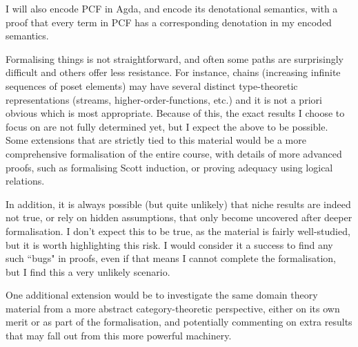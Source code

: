\documentclass{article}
\begin{document}
I will also encode PCF in Agda, and encode its denotational semantics, with a proof that every term in PCF has a corresponding denotation in my encoded semantics. 

Formalising things is not straightforward, and often some paths are surprisingly difficult and others offer less resistance. For instance, chains (increasing infinite sequences of poset elements) may have several distinct type-theoretic representations (streams, higher-order-functions, etc.) and it is not a priori obvious which is most appropriate. Because of this, the exact results I choose to focus on are not fully determined yet, but I expect the above to be possible. Some extensions that are strictly tied to this material would be a more comprehensive formalisation of the entire course, with details of more advanced proofs, such as formalising Scott induction, or proving adequacy using logical relations. 

In addition, it is always possible (but quite unlikely) that niche results are indeed not true, or rely on hidden assumptions, that only become uncovered after deeper formalisation. I don't expect this to be true, as the material is fairly well-studied, but it is worth highlighting this risk. I would consider it a success to find any such ``bugs" in proofs, even if that means I cannot complete the formalisation, but I find this a very unlikely scenario. 

One additional extension would be to investigate the same domain theory material from a more abstract category-theoretic perspective, either on its own merit or as part of the formalisation, and potentially commenting on extra results that may fall out from this more powerful machinery. 
\end{document}
